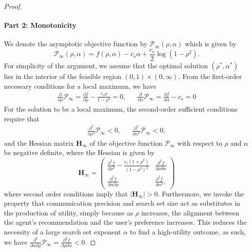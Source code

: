 \documentclass[12pt]{article}
\theoremstyle{definition}
\theoremstyle{remark}
\begin{document}
\begin{proof}
\paragraph{Part 2: Monotonicity}
We denote the asymptotic objective function by $\mathcal{P}_\infty(\rho, \alpha)$ which is given by
\begin{equation*}
    \mathcal{P}_\infty(\rho, \alpha) = f(\rho, \alpha) - c_s \alpha + \frac{c_c}{2} \log(1-\rho^2).
\end{equation*}
For simplicity of the argument, we assume that the optimal solution $(\rho^*, \alpha^*)$ lies in the interior of the feasible region $(0, 1) \times (0, \infty)$. From the first-order necessary conditions for a local maximum, we have
\begin{align}
\label{eq:foc}
    \frac{\partial}{\partial \rho} \mathcal{P}_\infty = \frac{\partial f}{\partial \rho} - \frac{c_c \rho}{1-\rho^2} = 0, && \frac{\partial}{\partial \alpha} \mathcal{P}_\infty = \frac{\partial f}{\partial \alpha} - c_s = 0
\end{align}
For the solution to be a local maximum, the second-order sufficient conditions require that
\begin{align*}
    \frac{\partial^2}{\partial \rho^2} \mathcal{P}_\infty <0, && \frac{\partial^2}{\partial \alpha^2} \mathcal{P}_\infty <0,
\end{align*}
and the Hessian matrix $\mathbf{H}_\infty$ of the objective function $\mathcal{P}_\infty$ with respect to $\rho$ and $\alpha$ be negative definite, where the Hessian is given by
\begin{equation*}
    \mathbf{H}_\infty
    = \begin{pmatrix}
        \frac{\partial^2 f}{\partial \rho^2} - \frac{c_c(1+\rho^2)}{(1-\rho^2)^2} & \frac{\partial^2 f}{\partial \rho \partial \alpha} \\
        \frac{\partial^2 f}{\partial \alpha \partial \rho} & \frac{\partial^2 f}{\partial \alpha^2},
    \end{pmatrix}
\end{equation*}
where second order conditions imply that $|\mathbf{H}_\infty | > 0$. Furthermore, we invoke the property that communication precision and search set size act as substitutes in the production of utility, simply because as $\rho$ increases, the alignment between the agent's recommendation and the user's preference increases. This reduces the necessity of a large search set exponent $\alpha$ to find a high-utility outcome, as such, we have $\frac{\partial^2}{\partial \alpha \partial \rho } \mathcal{P}_\infty = \frac{\partial^2 f}{\partial \rho \partial \alpha} < 0$.


\end{proof}
\end{document}
